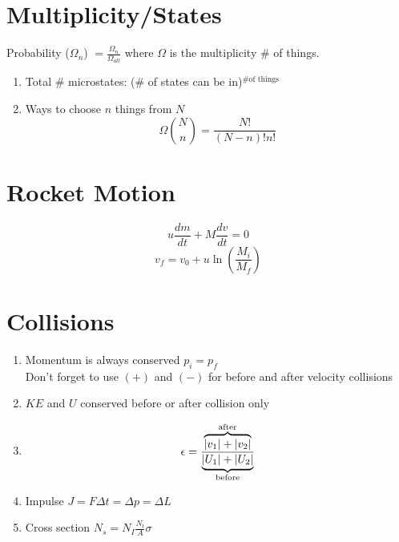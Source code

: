\documentclass[10pt,letter]{article}
\begin{document}
\section{Multiplicity/States} %
\label{sec:multiplicity_states}
Probability ($\Omega_n$) $=\frac{\Omega_n}{\Omega_{all}}$ where $\Omega$ is the multiplicity \# of things.
\begin{enumerate}
    \item Total \# microstates: (\# of states can be in)$^{\textrm{\# of things}}$ 
    \item Ways to choose $n$ things from $N$
    \begin{equation}
        \Omega \binom{N}{n} = \frac{N!}{(N-n)!n!}
    \end{equation}
\end{enumerate}

\section{Rocket Motion} %
\label{sec:rocket_motion}
\begin{equation}
    u \frac{dm}{dt} + M \frac{dv}{dt} = 0
\end{equation}
\begin{equation}
v_f = v_0 + u \ln \left( \frac{M_i}{M_f} \right)
\end{equation}

\section{Collisions} %
\label{sec:collisions}
\begin{enumerate}
    \item Momentum is always conserved $p_i = p_f$\\
    Don't forget to use $(+)$ and $(-)$ for before and after velocity collisions 
    \item $KE$ and $U$ conserved before or after collision only
    \item \begin{equation}
        \epsilon = \frac{\overbrace{|v_1| + |v_2|}^{\mathclap{\textrm{after}}}}{\underbrace{|U_1| + |U_2|}_{\mathclap{\textrm{before}}}}
    \end{equation} 
    \item Impulse $J = F \Delta t = \Delta p = \Delta L$
    \item Cross section $N_s = N_I \frac{N_t}{A} \sigma$
\end{enumerate}
\end{document}
